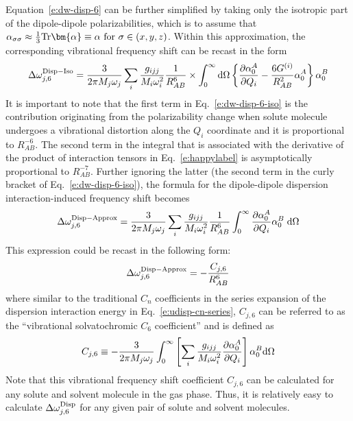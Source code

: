 \documentclass[b5paper,oneside,fleqn,11pt]{book}
\newcommand{\BM}[1]{\bm{#1}}
\newcommand{\fderiv}[2]{\ensuremath{
    \frac{\partial #1}{\partial #2}}}
\begin{document}
\begin{refsection}
Equation~\eqref{e:dw-disp-6} can be further simplified by taking only the isotropic 
part of the dipole\hyp{}dipole polarizabilities, which is to assume that 
$\alpha_{\sigma\sigma} \approx \frac{1}{3}{\rm Tr}{\BM\alpha} \equiv \alpha \text{ for } \sigma \in (x, y, z)$. 
Within this approximation, the corresponding vibrational frequency shift 
can be recast in the form
%
\begin{equation} \label{e:dw-disp-6-iso}
\Delta \omega_{j,6}^{\rm Disp-Iso} = \frac{3}{2\pi M_j\omega_j}
\sum_i \frac{g_{ijj}}{M_i\omega_i^2} 
\frac{1}{R^6_{AB}} \times
\int_{0}^{\infty} {\rm d}\Omega \left\{ 
\frac{\partial \alpha_0^{A}}{\partial Q_i}- 
\frac{6G^{(i)}}{R^2_{AB}} 
\alpha_0^{A}
\right\}
\alpha_0^{B} 
\end{equation}
%
It is important to note that the first term in Eq.~\eqref{e:dw-disp-6-iso} 
is the contribution originating from the polarizability change 
when solute molecule undergoes a vibrational distortion 
along the $Q_i$ coordinate and it is proportional to $R^{-6}_{AB}$. 
The second term in the integral that is associated with the derivative 
of the product of interaction tensors in Eq.~\eqref{e:happylabel}
is asymptotically proportional to $R^{-7}_{AB}$. Further ignoring the latter 
(the second term in the curly bracket of Eq.~\eqref{e:dw-disp-6-iso}), 
the formula for the dipole\hyp{}dipole dispersion interaction\hyp{}induced 
frequency shift becomes
%
\begin{equation} \label{e:dw-disp-6-iso-approx}
\Delta \omega_{j,6}^{\rm Disp-Approx} = \frac{3}{2\pi M_j\omega_j}
\sum_i \frac{g_{ijj}}{M_i\omega_i^2} 
\frac{1}{R^6_{AB}} 
\int_{0}^{\infty} 
\frac{\partial \alpha_0^{A}}{\partial Q_i}
\alpha_0^{B}  \;{\rm d}\Omega  
\end{equation}
%
This expression could be recast in the following form: 
%
\begin{equation} \label{e:dw-disp-6-iso-approx-cj6}
\Delta \omega_{j,6}^{\rm Disp-Approx} = 
 - \frac{C_{j,6}}{R_{AB}^6}
\end{equation}
%
where similar to the traditional $C_n$ coefficients 
in the series expansion of the dispersion interaction 
energy in Eq.~\eqref{e:udisp-cn-series}, $C_{j,6}$ 
can be referred to as 
the ``vibrational solvatochromic $C_6$ coefficient''
and is defined as
%
\begin{equation} \label{e:cj6}
C_{j,6} \equiv
-\frac{3}{2\pi M_j\omega_j} 
\int_{0}^{\infty} 
\left[
\sum_i \frac{g_{ijj}}{M_i\omega_i^2} 
\fderiv{\alpha_0^{A}}{Q_i}
\right]
\alpha_0^{B} 
{\rm d}\Omega  
\end{equation}
%
Note that this vibrational frequency shift coefficient 
$C_{j,6}$ can be calculated for any solute and solvent 
molecule in the gas phase. Thus, it is relatively easy 
to calculate $\Delta \omega_{j,6}^{\rm Disp}$ for any 
given pair of solute and solvent molecules.


\end{refsection}
\end{document}
